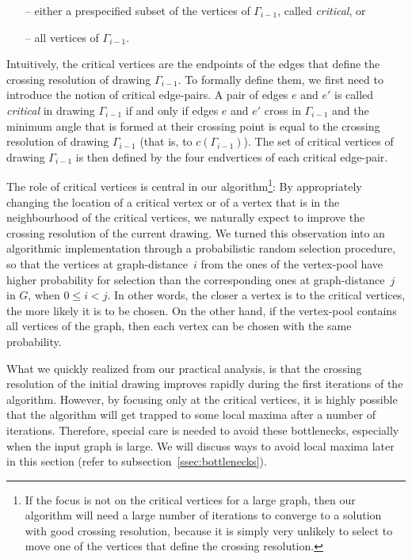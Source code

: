 \documentclass{comjnl}
\begin{document}
\begin{itemize}
\item[--] either a prespecified subset of the vertices of $\Gamma_{i-1}$, called \emph{critical}, or
\item[--] all vertices of $\Gamma_{i-1}$.
\end{itemize}

Intuitively, the critical vertices are the endpoints of the edges that define the crossing resolution of drawing $\Gamma_{i-1}$. To formally define them, we first need to introduce the notion of critical edge-pairs. A pair of edges $e$ and $e'$ is called \emph{critical} in drawing $\Gamma_{i-1}$ if and only if edges $e$ and $e'$ cross in $\Gamma_{i-1}$ and the minimum angle that is formed at their crossing point is equal to the crossing resolution of drawing $\Gamma_{i-1}$ (that is, to $c(\Gamma_{i-1})$). The set of critical vertices of drawing $\Gamma_{i-1}$ is then defined by the four endvertices of each critical edge-pair.

The role of critical vertices is central in our algorithm\footnote{If the focus is not on the critical vertices for a large graph, then our algorithm will need a large number of iterations to converge to a solution with good crossing resolution, because it is simply very unlikely to select to move one of the vertices that define the crossing resolution.}: By appropriately changing the location of a critical vertex or of a vertex that is in the neighbourhood of the critical vertices, we naturally expect to improve the crossing resolution of the current drawing. We turned this observation into an algorithmic implementation through a probabilistic random selection procedure, so that the vertices at graph-distance~$i$ from the ones of the vertex-pool have higher probability for selection than the corresponding ones at graph-distance~$j$  in $G$, when $0 \leq i<j$. In other words, the closer a vertex is to the critical vertices, the more likely it is to be chosen. On the other hand, if the vertex-pool contains all vertices of the graph, then each vertex can be chosen with the same probability.

What we quickly realized from our practical analysis, is that the crossing resolution of the initial drawing improves rapidly during the first iterations of the algorithm. However, by focusing only at the critical vertices, it is highly possible that the algorithm will get trapped to some local maxima after a number of iterations. Therefore, special care is needed to avoid these bottlenecks, especially when the input graph is large. We will discuss ways to avoid local maxima later in this section (refer to subsection~\ref{ssec:bottlenecks}).
\end{document}
